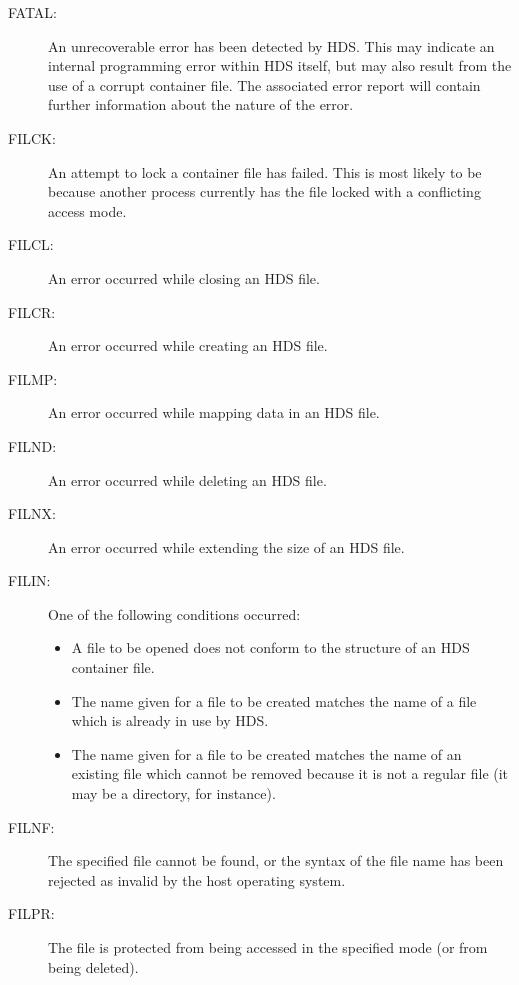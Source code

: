 \begin{description}
\item [FATAL:]
An unrecoverable error has been detected by HDS. This may indicate an internal
programming error within HDS itself, but may also result from the use of a
corrupt container file. The associated error report will contain further
information about the nature of the error.

\item [FILCK:]
An attempt to lock a container file has failed. This is most likely to be
because another process currently has the file locked with a conflicting access
mode.

\item [FILCL:]
An error occurred while closing an HDS file.

\item [FILCR:]
An error occurred while creating an HDS file.

\item [FILMP:]
An error occurred while mapping data in an HDS file.

\item [FILND:]
An error occurred while deleting an HDS file.

\item [FILNX:]
An error occurred while extending the size of an HDS file.

\item [FILIN:]
One of the following conditions occurred:
\begin{itemize}

\item A file to be opened does not conform to the structure of an HDS container
file.

\item The name given for a file to be created matches the name of a file which
is already in use by HDS.

\item The name given for a file to be created matches the name of an existing
file which cannot be removed because it is not a regular file (it may be a
directory, for instance).

\end{itemize}

\item [FILNF:]
The specified file cannot be found, or the syntax of the file name has been
rejected as invalid by the host operating system.

\item [FILPR:]
The file is protected from being accessed in the specified mode (or from being
deleted).


\end{description}
